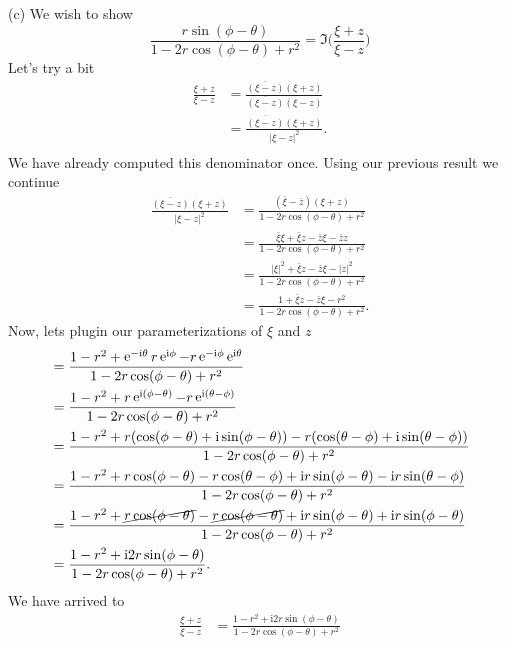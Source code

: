 \documentclass[10pt]{amsart}
\newcommand{\I}{\mathrm{i}}
\DeclareMathOperator{\E}{e}
\theoremstyle{nonumberplain}
\begin{document}
\begin{enumerate}[label={\bf {\arabic*}:}]
\noindent
(c) We wish to show
$$
\frac{r\sin(\phi -\theta)}{1 - 2r \cos (\phi-\theta) + r^2} = \Im \bigg(\frac {\xi + z}{\xi - z}\bigg)
$$
Let's try a bit
\begin{align*}
\frac {\xi + z}{\xi - z} &= \frac {\overline{(\xi - z)}(\xi + z)}{\overline{(\xi - z)}(\xi - z)} \\
	&= \frac {\overline{(\xi - z)}(\xi + z)}{|\xi - z|^2}. \\
\end{align*}
We have already computed this denominator once.
Using our previous result we continue
\begin{align*}
\frac {\overline{(\xi - z)}(\xi + z)}{|\xi - z|^2}
	&= \frac {(\bar \xi - \bar z)(\xi + z)}{1 - 2r \cos (\phi - \theta) + r^2} \\
	&= \frac {\bar \xi \xi + \bar \xi z - \bar z \xi - \bar z z}{1 - 2r \cos (\phi - \theta) + r^2} \\
	&= \frac {|\xi|^2 + \bar \xi z - \bar z \xi - |z|^2}{1 - 2r \cos (\phi - \theta) + r^2} \\
	&= \frac {1 + \bar \xi z - \bar z \xi - r^2}{1 - 2r \cos (\phi - \theta) + r^2}.
\end{align*}
Now, lets plugin our parameterizations of $\xi$ and $z$
\begin{align*}
	&= \frac {1 - r^2 + \E^{-\I \theta} r\E^{\I \phi} - r\E^{-\I \phi} \E^{\I \theta}}{1 - 2r \cos (\phi - \theta) + r^2} \\
	&= \frac {1 - r^2 + r\E^{\I (\phi - \theta)} - r\E^{\I(\theta - \phi)}}{1 - 2r \cos (\phi - \theta) + r^2} \\
	&= \frac {1 - r^2 + r(\cos(\phi - \theta) + \I \sin(\phi - \theta)) - r(\cos(\theta - \phi) + \I \sin(\theta - \phi))}{1 - 2r \cos (\phi - \theta) + r^2} \\
	&= \frac {1 - r^2 + r\cos(\phi - \theta) - r\cos(\theta - \phi) + \I r\sin(\phi - \theta) - \I r\sin(\theta - \phi)}{1 - 2r \cos (\phi - \theta) + r^2} \\
	&= \frac {1 - r^2 + \cancel{r\cos(\phi - \theta)} - \cancel{r\cos(\phi - \theta)} + \I r\sin(\phi - \theta) + \I r\sin(\phi - \theta)}{1 - 2r \cos (\phi - \theta) + r^2} \\
	&= \frac {1 - r^2 + \I 2 r\sin(\phi - \theta)}{1 - 2r \cos (\phi - \theta) + r^2}.
\end{align*}
We have arrived to 
\begin{align*}
\frac {\xi + z}{\xi - z} &= \frac {1 - r^2 + \I 2 r\sin(\phi - \theta)}{1 - 2r \cos (\phi - \theta) + r^2} \\

\end{align*}
\end{enumerate}
\end{document}
